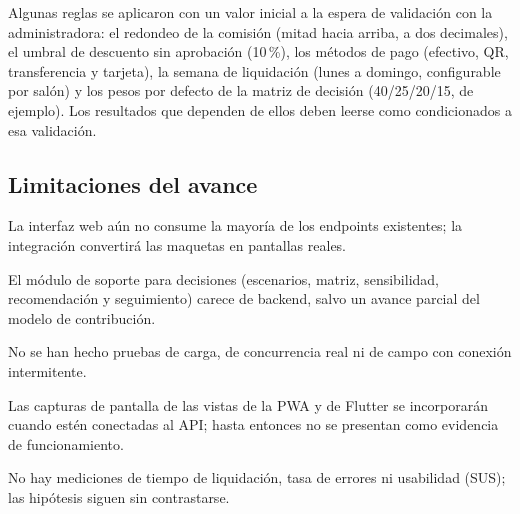 Algunas reglas se aplicaron con un valor inicial a la espera de validación con la administradora: el redondeo de la comisión (mitad hacia arriba, a dos decimales), el umbral de descuento sin aprobación (10\,\%), los métodos de pago (efectivo, QR, transferencia y tarjeta), la semana de liquidación (lunes a domingo, configurable por salón) y los pesos por defecto de la matriz de decisión (40/25/20/15, de ejemplo). Los resultados que dependen de ellos deben leerse como condicionados a esa validación.

\subsection{Limitaciones del avance}

\begin{vinetas}
\item La interfaz web aún no consume la mayoría de los endpoints existentes; la integración convertirá las maquetas en pantallas reales.
\item El módulo de soporte para decisiones (escenarios, matriz, sensibilidad, recomendación y seguimiento) carece de backend, salvo un avance parcial del modelo de contribución.
\item No se han hecho pruebas de carga, de concurrencia real ni de campo con conexión intermitente.
\item Las capturas de pantalla de las vistas de la PWA y de Flutter se incorporarán cuando estén conectadas al API; hasta entonces no se presentan como evidencia de funcionamiento.
\item No hay mediciones de tiempo de liquidación, tasa de errores ni usabilidad (SUS); las hipótesis siguen sin contrastarse.
\end{vinetas}
